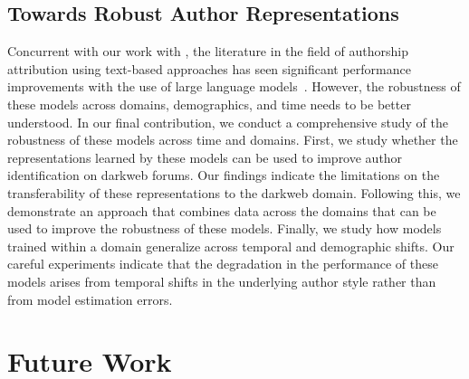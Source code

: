 \subsection{Towards Robust Author Representations}
Concurrent with our work with \SYSMLmethodname{}, the literature in the field of authorship attribution using text-based approaches has seen significant performance improvements with the use of large language models~\citep{khan2021deep,riverastao2021learning}.
However, the robustness of these models across domains, demographics, and time needs to be better understood.
In our final contribution, we conduct a comprehensive study of the robustness of these models across time and domains.
First, we study whether the representations learned by these models can be used to improve author identification on darkweb forums.
Our findings indicate the limitations on the transferability of these representations to the darkweb domain.
Following this, we demonstrate an approach that combines data across the domains that can be used to improve the robustness of these models.
Finally, we study how models trained within a domain generalize across temporal and demographic shifts.
Our careful experiments indicate that the degradation in the performance of these models arises from temporal shifts in the underlying author style rather than from model estimation errors.


\section{Future Work}

